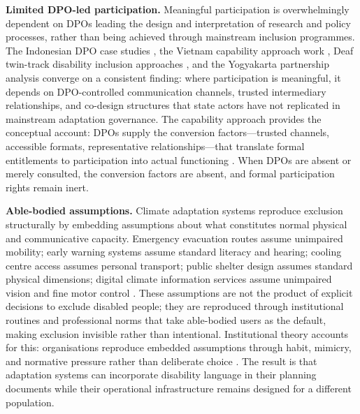 \documentclass[12pt,a4paper]{article}
\begin{document}
\textbf{Limited DPO-led participation.} Meaningful participation is overwhelmingly dependent on DPOs leading the design and interpretation of research and policy processes, rather than being achieved through mainstream inclusion programmes. The Indonesian DPO case studies \cite{pertiwi2019dpo,pertiwi2022bridging,villeneuve2017dpo}, the Vietnam capability approach work \cite{ton2021agency,ton2020capabilities}, Deaf twin-track disability inclusion approaches \cite{craig2023twintrack,cooper2021vietnam,calgaro2021silent}, and the Yogyakarta partnership analysis \cite{rahatiningtyas2025yogyakarta} converge on a consistent finding: where participation is meaningful, it depends on DPO-controlled communication channels, trusted intermediary relationships, and co-design structures that state actors have not replicated in mainstream adaptation governance. The capability approach provides the conceptual account: DPOs supply the conversion factors---trusted channels, accessible formats, representative relationships---that translate formal entitlements to participation into actual functioning \cite{sen_1999_development,ton2021agency,villeneuve2021pcep}. When DPOs are absent or merely consulted, the conversion factors are absent, and formal participation rights remain inert.

\textbf{Able-bodied assumptions.} Climate adaptation systems reproduce exclusion structurally by embedding assumptions about what constitutes normal physical and communicative capacity. Emergency evacuation routes assume unimpaired mobility; early warning systems assume standard literacy and hearing; cooling centre access assumes personal transport; public shelter design assumes standard physical dimensions; digital climate information services assume unimpaired vision and fine motor control \cite{lunga2019zimbabwe,gershon2021fema,ivey2014deafhh,brown2025massachusetts,engelman2025california}. These assumptions are not the product of explicit decisions to exclude disabled people; they are reproduced through institutional routines and professional norms that take able-bodied users as the default, making exclusion invisible rather than intentional. Institutional theory accounts for this: organisations reproduce embedded assumptions through habit, mimicry, and normative pressure rather than deliberate choice \cite{dimaggio_powell_1983_ironcage}. The result is that adaptation systems can incorporate disability language in their planning documents while their operational infrastructure remains designed for a different population.
\end{document}
